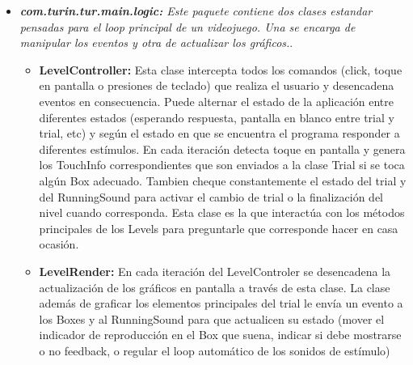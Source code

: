 \documentclass{article}
\numberwithin{figure}{section}
\begin{document}
\begin{itemize}
         \item \textit{\textbf{com.turin.tur.main.logic:} Este paquete contiene dos clases estandar pensadas para el loop principal de un videojuego. Una se encarga de manipular los eventos y otra de actualizar los gráficos.}.
         \begin{itemize}
             \item \textbf{LevelController:} Esta clase intercepta todos los comandos (click, toque en pantalla o presiones de teclado) que realiza el usuario y desencadena eventos en consecuencia. Puede alternar el estado de la aplicación entre diferentes estados (esperando respuesta, pantalla en blanco entre trial y trial, etc) y según el estado en que se encuentra el programa responder a diferentes estímulos. En cada iteración detecta toque en pantalla y genera los TouchInfo correspondientes que son enviados a la clase Trial si se toca algún Box adecuado. Tambien cheque constantemente el estado del trial y del RunningSound para activar el cambio de trial o la finalización del nivel cuando corresponda. Esta clase es la que interactúa con los métodos principales de los Levels para preguntarle que corresponde hacer en casa ocasión. 
             \item \textbf{LevelRender:} En cada iteración del LevelControler se desencadena la actualización de los gráficos en pantalla a través de esta clase. La clase además de graficar los elementos principales del trial le envía un evento a los Boxes y al RunningSound para que actualicen su estado (mover el indicador de reproducción en el Box que suena, indicar si debe mostrarse o no feedback, o regular el loop automático de los sonidos de estímulo)
         \end{itemize}
        

\end{itemize}
\end{document}
